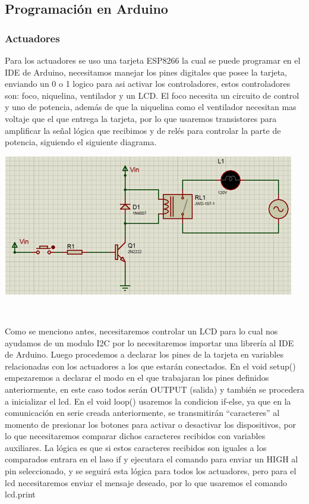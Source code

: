 \documentclass[12pt]{report}
\begin{document}
\subsection{Programación en Arduino}
\subsubsection{Actuadores}
Para los actuadores se uso una tarjeta ESP8266 la cual se puede programar en el IDE de Arduino, necesitamos manejar los pines digitales que posee la tarjeta, enviando un 0 o 1 logico para asi activar los controladores, estos controladores son: foco, niquelina, ventilador y un LCD. 
El foco necesita un circuito de control y uno de potencia, además de que la niquelina como el ventilador necesitan mas voltaje que el que entrega la tarjeta, por lo que usaremos transistores para amplificar la señal lógica que recibimos y de relés para controlar la parte de potencia, siguiendo el siguiente diagrama.
\begin{center}
\includegraphics[scale=0.8]{Documento/Figuras/9.PNG}
\begin{scriptsize}
\\ 
\end{scriptsize}
\end{center}
Como se menciono antes, necesitaremos controlar un LCD para lo cual nos ayudamos de un modulo I2C por lo necesitaremos importar una librería al IDE de Arduino.
Luego procedemos a declarar los pines de la tarjeta en variables relacionadas con los actuadores a los que estarán conectados. 
En el void setup() empezaremos a declarar el modo en el que trabajaran los pines definidos anteriormente, en este caso todos serán OUTPUT (salida) y también se procedera a inicializar el lcd.
En el void loop() usaremos la condicion if-else, ya que en la comunicación en serie creada anteriormente, se transmitirán “caracteres” al momento de presionar los botones para activar o desactivar los dispositivos, por lo que necesitaremos comparar dichos caracteres recibidos con variables auxiliares. La lógica es que si estos caracteres recibidos son iguales a los comparados entrara en el laso if y ejecutara el comando para enviar un HIGH al pin seleccionado, y se seguirá esta lógica para todos los actuadores, pero para el lcd necesitaremos enviar el mensaje deseado, por lo que usaremos el comando lcd.print
\end{document}
